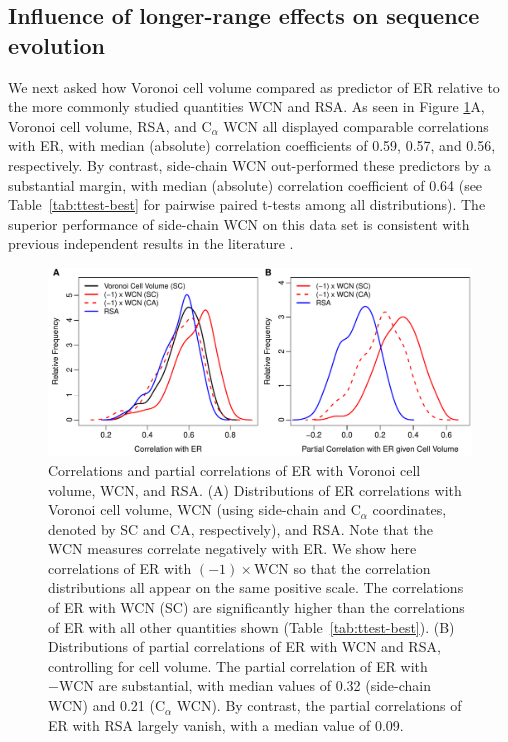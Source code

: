 \documentclass[12pt]{article}
\begin{document}
\subsection*{Influence of longer-range effects on sequence evolution}

We next asked how Voronoi cell volume compared as predictor of ER relative to the more commonly studied quantities WCN and RSA. As seen in Figure \ref{fig:best_predictorER}A, Voronoi cell volume, RSA, and C$_{\alpha}$ WCN all displayed comparable correlations with ER, with median (absolute) correlation coefficients of 0.59, 0.57, and 0.56, respectively. By contrast, side-chain WCN out-performed these predictors by a substantial margin, with median (absolute) correlation coefficient of 0.64 (see Table~\ref{tab:ttest-best} for pairwise paired t-tests among all distributions). The superior performance of side-chain WCN on this data set is consistent with previous independent results in the literature \cite{marcos_too_2015}.

    \begin{figure}
        \begin{center}
            \includegraphics[width=6.5in]{best_structural_predictors_of_ER_screen.pdf}
        \end{center}
        \caption{Correlations and partial correlations of ER with Voronoi cell volume, WCN, and RSA. (A) Distributions of ER correlations with Voronoi cell volume, WCN (using side-chain and C$_\alpha$  coordinates, denoted by SC and CA, respectively), and RSA. Note that the WCN measures correlate negatively with ER. We show here correlations of ER with $(-1)\times \text{WCN}$ so that the correlation distributions all appear on the same positive scale. The correlations of ER with WCN (SC) are significantly higher than the correlations of ER with all other quantities shown (Table~\ref{tab:ttest-best}). (B) Distributions of partial correlations of ER with WCN and RSA, controlling for cell volume. The partial correlation of ER with $-\text{WCN}$ are substantial, with median values of 0.32 (side-chain WCN) and 0.21 (C$_\alpha$ WCN). By contrast, the partial correlations of ER with RSA largely vanish, with a median value of 0.09.} \label{fig:best_predictorER}
    \end{figure}
\end{document}
